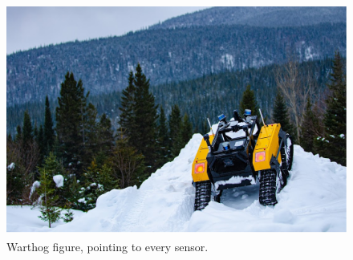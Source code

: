 \begin{figure}
	\centering
	\includegraphics[height=3.0in]{figs/warthog_sys_description.pdf}
	\caption{Warthog figure, pointing to every sensor.}
	\label{fig:warthog}
\end{figure}
